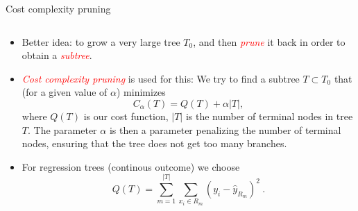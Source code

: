 \documentclass[10pt,ignorenonframetext,]{beamer}
\providecommand{\tightlist}{%
  \setlength{\itemsep}{0pt}\setlength{\parskip}{0pt}}
\begin{document}
\begin{frame}

\begin{block}{Cost complexity pruning}

\(~\)

\begin{itemize}
\tightlist
\item
  Better idea: to grow a very large tree \(T_0\), and then
  \emph{\textcolor{red}{prune}} it back in order to obtain a
  \emph{\textcolor{red}{subtree}}.
\end{itemize}

\vspace{2mm}

\begin{itemize}
\tightlist
\item
  \emph{\textcolor{red}{Cost complexity pruning}} is used for this: We
  try to find a subtree \(T\subset T_0\) that (for a given value of
  \(\alpha\)) minimizes \[
  C_{\alpha}(T)=Q(T)+\alpha |T|,
  \] where \(Q(T)\) is our cost function, \(|T|\) is the number of
  terminal nodes in tree \(T\). The parameter \(\alpha\) is then a
  parameter penalizing the number of terminal nodes, ensuring that the
  tree does not get too many branches.
\end{itemize}

\vspace{2mm}

\begin{itemize}
\tightlist
\item
  For regression trees (continous outcome) we choose
  \[Q(T)=\sum_{m=1}^{|T|}\sum_{x_i\in R_m}(y_i - \hat{y}_{R_m})^2 \ .\]
\end{itemize}

\end{block}

\end{frame}
\end{document}
